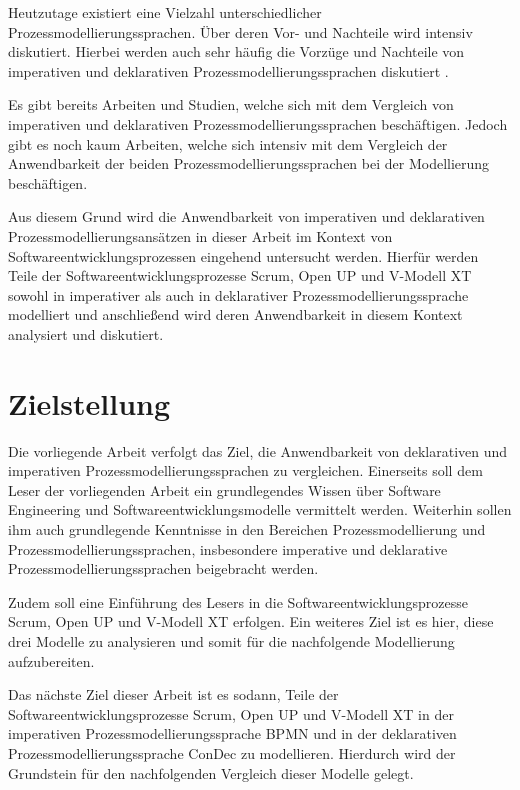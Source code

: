 Heutzutage existiert eine Vielzahl unterschiedlicher Prozessmodellierungssprachen. Über deren Vor- und Nachteile wird intensiv diskutiert. Hierbei werden auch sehr häufig die Vorzüge und Nachteile von imperativen und deklarativen Prozessmodellierungssprachen diskutiert \cite{fahland2010}. \newline

Es gibt bereits Arbeiten und Studien, welche sich mit dem Vergleich von imperativen und deklarativen Prozessmodellierungssprachen beschäftigen. Jedoch gibt es noch kaum Arbeiten, welche sich intensiv mit dem Vergleich der Anwendbarkeit der beiden Prozessmodellierungssprachen bei der Modellierung beschäftigen.\newline

Aus diesem Grund wird die Anwendbarkeit von imperativen und deklarativen Prozessmodellierungsansätzen in dieser Arbeit im Kontext von Softwareentwicklungsprozessen eingehend untersucht werden. Hierfür werden Teile der Softwareentwicklungsprozesse Scrum, Open UP und V-Modell XT sowohl in imperativer als auch in deklarativer Prozessmodellierungssprache modelliert und anschließend wird deren Anwendbarkeit in diesem Kontext analysiert und diskutiert.\newline



\section{Zielstellung}
Die vorliegende Arbeit verfolgt das Ziel, die Anwendbarkeit von deklarativen und imperativen Prozessmodellierungssprachen zu vergleichen. Einerseits soll dem Leser der vorliegenden Arbeit ein grundlegendes Wissen über Software Engineering und Softwareentwicklungsmodelle vermittelt werden. Weiterhin sollen ihm auch grundlegende Kenntnisse in den Bereichen Prozessmodellierung und Prozessmodellierungssprachen, insbesondere imperative und deklarative Prozessmodellierungssprachen beigebracht werden. \newline

Zudem soll eine Einführung des Lesers in die Softwareentwicklungsprozesse Scrum, Open UP und V-Modell XT erfolgen. Ein weiteres Ziel ist es hier, diese drei Modelle zu analysieren und somit für die nachfolgende Modellierung aufzubereiten.\newline

Das nächste Ziel dieser Arbeit ist es sodann, Teile der Softwareentwicklungsprozesse Scrum, Open UP und V-Modell XT in der imperativen Prozessmodellierungssprache BPMN und in der deklarativen Prozessmodellierungssprache ConDec zu modellieren. Hierdurch wird der Grundstein für den nachfolgenden Vergleich dieser Modelle gelegt.\newline

